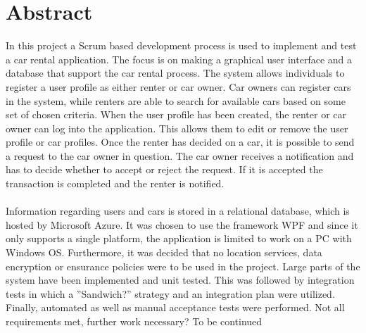 \documentclass[Rapport/Rapport_main.tex]{subfiles}
\begin{document}
\section{Abstract}
In this project a Scrum based development process is used to implement and test a car rental application. The focus is on making a graphical user interface and a database that support the car rental process. The system allows individuals to register a user profile as either renter or car owner. Car owners can register cars in the system, while renters are able to search for available cars based on some set of chosen criteria. When the user profile has been created, the renter or car owner can log into the application. This allows them to edit or remove the user profile or car profiles. Once the renter has decided on a car, it is possible to send a request to the car owner in question. The car owner receives a notification and has to decide whether to accept or reject the request. If it is accepted the transaction is completed and the renter is notified.\\\\Information regarding users and cars is stored in a relational database, which is hosted by Microsoft Azure. It was chosen to use the framework WPF and since it only supports a single platform, the application is limited to work on a PC with Windows OS. Furthermore, it was decided that no location services, data encryption or ensurance policies were to be used in the project. Large parts of the system have been implemented and unit tested. This was followed by integration tests in which a ''Sandwich?'' strategy and an integration plan were utilized. Finally, automated as well as manual acceptance tests were performed. Not all requirements met, further work necessary? To be continued 
\end{document}
